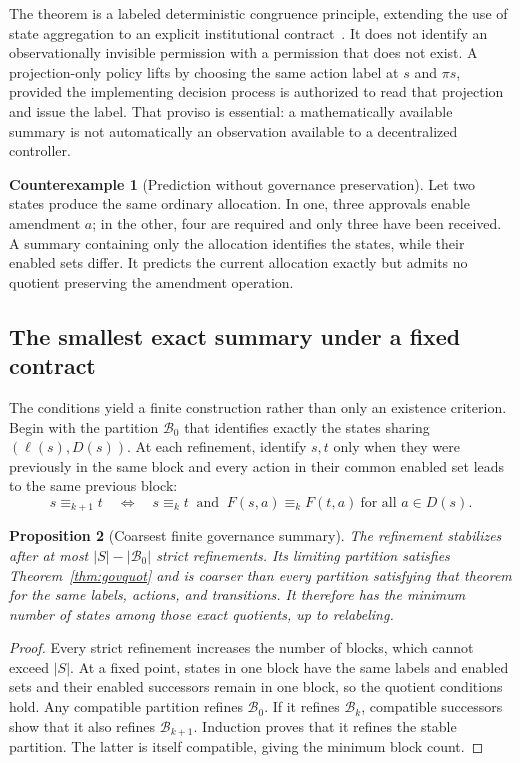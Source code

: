 \documentclass[11pt,letterpaper]{article}
\theoremstyle{plain}
\newtheorem{proposition}{Proposition}[section]
\theoremstyle{definition}
\newtheorem{counterexample}[proposition]{Counterexample}
\theoremstyle{remark}
\begin{document}
The theorem is a labeled deterministic congruence principle, extending the use of state aggregation to an explicit institutional contract~\cite{givan}. It does not identify an observationally invisible permission with a permission that does not exist. A projection-only policy lifts by choosing the same action label at $s$ and $\pi s$, provided the implementing decision process is authorized to read that projection and issue the label. That proviso is essential: a mathematically available summary is not automatically an observation available to a decentralized controller.

\begin{counterexample}[Prediction without governance preservation]\label{ex:govloss}
Let two states produce the same ordinary allocation. In one, three approvals enable amendment $a$; in the other, four are required and only three have been received. A summary containing only the allocation identifies the states, while their enabled sets differ. It predicts the current allocation exactly but admits no quotient preserving the amendment operation.
\end{counterexample}

\subsection{The smallest exact summary under a fixed contract}
The conditions yield a finite construction rather than only an existence criterion. Begin with the partition $\mathcal B_0$ that identifies exactly the states sharing $(\ell(s),D(s))$. At each refinement, identify $s,t$ only when they were previously in the same block and every action in their common enabled set leads to the same previous block:
\[
s\equiv_{k+1}t\quad\Longleftrightarrow\quad
s\equiv_kt\ \text{ and }\ F(s,a)\equiv_kF(t,a)
\ \text{for all }a\in D(s).
\]

\begin{proposition}[Coarsest finite governance summary]\label{prop:govrefine}
The refinement stabilizes after at most $|S|-|\mathcal B_0|$ strict refinements. Its limiting partition satisfies Theorem~\ref{thm:govquot} and is coarser than every partition satisfying that theorem for the same labels, actions, and transitions. It therefore has the minimum number of states among those exact quotients, up to relabeling.
\end{proposition}
\begin{proof}
Every strict refinement increases the number of blocks, which cannot exceed $|S|$. At a fixed point, states in one block have the same labels and enabled sets and their enabled successors remain in one block, so the quotient conditions hold. Any compatible partition refines $\mathcal B_0$. If it refines $\mathcal B_k$, compatible successors show that it also refines $\mathcal B_{k+1}$. Induction proves that it refines the stable partition. The latter is itself compatible, giving the minimum block count.
\end{proof}
\end{document}
